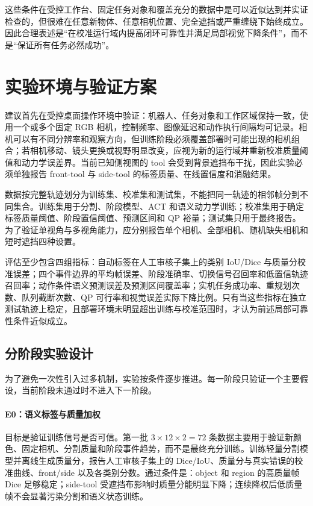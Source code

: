 \documentclass[UTF8,a4paper,11pt]{ctexart}
\begin{document}
这些条件在受控工作台、固定任务对象和覆盖充分的数据中是可以近似达到并实证检查的，但很难在任意新物体、任意相机位置、完全遮挡或严重缠绕下始终成立。因此合理表述是“在校准运行域内提高闭环可靠性并满足局部视觉下降条件”，而不是“保证所有任务必然成功”。

\section{实验环境与验证方案}

建议首先在受控桌面操作环境中验证：机器人、任务对象和工作区域保持一致，使用一个或多个固定 RGB 相机，控制频率、图像延迟和动作执行间隔均可记录。相机可以有不同分辨率和观察方向，但训练阶段必须覆盖部署时可能出现的相机组合；若相机移动、镜头更换或视野明显改变，应视为新的运行域并重新校准质量阈值和动力学误差界。当前已知侧视图的 tool 会受到背景遮挡布干扰，因此实验必须单独报告 front-tool 与 side-tool 的标签质量、在线置信度和消融结果。

数据按完整轨迹划分为训练集、校准集和测试集，不能把同一轨迹的相邻帧分到不同集合。训练集用于分割、阶段模型、ACT 和语义动力学训练；校准集用于确定标签质量阈值、阶段置信阈值、预测区间和 QP 裕量；测试集只用于最终报告。为了验证单视角与多视角能力，应分别报告单个相机、全部相机、随机缺失相机和短时遮挡四种设置。

评估至少包含四组指标：自动标签在人工审核子集上的类别 IoU/Dice 与质量分校准误差；四个事件边界的平均帧误差、阶段准确率、切换信号召回率和低置信轨迹召回率；动作条件语义预测误差及预测区间覆盖率；实机任务成功率、重规划次数、队列截断次数、QP 可行率和视觉误差实际下降比例。只有当这些指标在独立测试轨迹上稳定，且部署环境未明显超出训练与校准范围时，才认为前述局部可靠性条件近似成立。

\subsection{分阶段实验设计}

为了避免一次性引入过多机制，实验按条件逐步推进。每一阶段只验证一个主要假设，当前阶段未通过时不进入下一阶段。

\paragraph{E0：语义标签与质量加权}
目标是验证训练信号是否可信。第一批 $3\times12\times2=72$ 条数据主要用于验证新颜色、固定相机、分割质量和阶段事件趋势，而不是最终充分训练。训练轻量分割模型并离线生成质量分，报告人工审核子集上的 Dice/IoU、质量分与真实错误的校准曲线、front/side 以及各类别分数。通过条件是：object 和 region 的高质量帧 Dice 足够稳定；side-tool 受遮挡布影响时质量分能明显下降；连续降权后低质量帧不会显著污染分割和语义状态训练。
\end{document}
